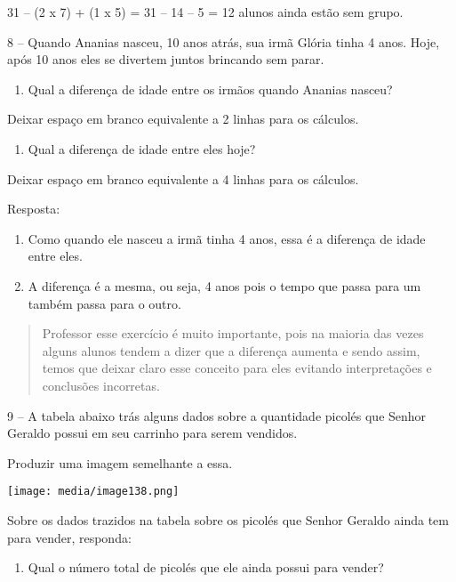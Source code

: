 31 -- (2 x 7) + (1 x 5) = 31 -- 14 -- 5 = 12 alunos ainda estão sem
grupo.

8 -- Quando Ananias nasceu, 10 anos atrás, sua irmã Glória tinha 4 anos.
Hoje, após 10 anos eles se divertem juntos brincando sem parar.

\begin{enumerate}
\def\labelenumi{\alph{enumi})}
\item
  Qual a diferença de idade entre os irmãos quando Ananias nasceu?
\end{enumerate}

Deixar espaço em branco equivalente a 2 linhas para os cálculos.

\begin{enumerate}
\def\labelenumi{\alph{enumi})}
\item
  Qual a diferença de idade entre eles hoje?
\end{enumerate}

Deixar espaço em branco equivalente a 4 linhas para os cálculos.

Resposta:

\begin{enumerate}
\def\labelenumi{\alph{enumi})}
\item
  Como quando ele nasceu a irmã tinha 4 anos, essa é a diferença de
  idade entre eles.
\item
  A diferença é a mesma, ou seja, 4 anos pois o tempo que passa para um
  também passa para o outro.
\end{enumerate}

\begin{quote}
Professor esse exercício é muito importante, pois na maioria das vezes
alguns alunos tendem a dizer que a diferença aumenta e sendo assim,
temos que deixar claro esse conceito para eles evitando interpretações e
conclusões incorretas.
\end{quote}

9 -- A tabela abaixo trás alguns dados sobre a quantidade picolés que
Senhor Geraldo possui em seu carrinho para serem vendidos.

Produzir uma imagem semelhante a essa.

\texttt{[image: media/image138.png]}

Sobre os dados trazidos na tabela sobre os picolés que Senhor Geraldo
ainda tem para vender, responda:

\begin{enumerate}
\def\labelenumi{\alph{enumi})}
\item
  Qual o número total de picolés que ele ainda possui para vender?
\end{enumerate}

